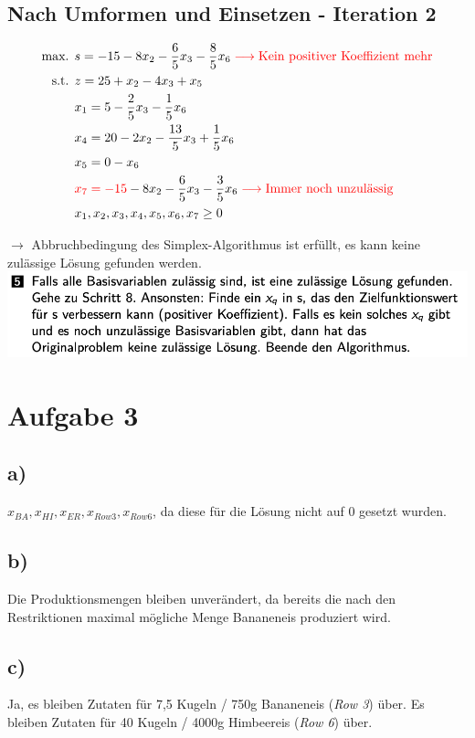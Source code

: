 \documentclass[a4paper,11pt]{article}
\begin{document}
\subsection*{Nach Umformen und Einsetzen - Iteration 2}
\begin{align*}
\text{max. } & s = -15 - 8x_2 - \frac{6}{5}x_3 - \frac{8}{5}x_6 \color{red} \longrightarrow \text{Kein positiver Koeffizient mehr} \\
\text{s.t. } & z = 25 + x_2 - 4x_3 +x_5 \\
& x_1 = 5 - \frac{2}{5}x_3 - \frac{1}{5}x_6 \\
& x_4 = 20 - 2x_2 - \frac{13}{5}x_3 + \frac{1}{5}x_6 \\
& x_5 = 0 - x_6 \\
& {\color{red} x_7 = -15} - 8x_2 - \frac{6}{5}x_3 - \frac{3}{5}x_6 \color{red} \longrightarrow \text{Immer noch unzulässig} \\
& x_1, x_2, x_3, x_4, x_5, x_6, x_7 \ge 0
\end{align*}

$\to$ Abbruchbedingung des Simplex-Algorithmus ist erfüllt, es kann keine zulässige Lösung gefunden werden. \\

\vspace{4mm}
\includegraphics[width=.7\linewidth]{src/unzulaessig.png}

\section*{Aufgabe 3}
\subsection*{a)}
$x_{BA}, x_{HI}, x_{ER}, x_{Row3}, x_{Row6}$, da diese für die Lösung nicht auf 0 gesetzt wurden.

\subsection*{b)}
Die Produktionsmengen bleiben unverändert, da bereits die nach den Restriktionen maximal mögliche Menge Bananeneis produziert wird.

\subsection*{c)}
Ja, es bleiben Zutaten für 7,5 Kugeln / 750g Bananeneis (\emph{Row 3}) über.
Es bleiben Zutaten für 40 Kugeln / 4000g Himbeereis (\emph{Row 6}) über.
\end{document}
